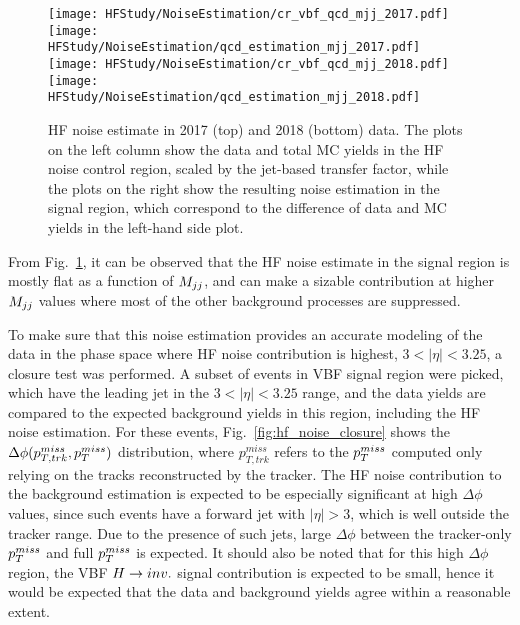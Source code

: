 \begin{figure}[h!]
    \centering
        \texttt{[image: HFStudy/NoiseEstimation/cr\_vbf\_qcd\_mjj\_2017.pdf]}
        \texttt{[image: HFStudy/NoiseEstimation/qcd\_estimation\_mjj\_2017.pdf]} \\ 
        \texttt{[image: HFStudy/NoiseEstimation/cr\_vbf\_qcd\_mjj\_2018.pdf]}
        \texttt{[image: HFStudy/NoiseEstimation/qcd\_estimation\_mjj\_2018.pdf]}
    \caption{HF noise estimate in 2017 (top) and 2018 (bottom) data. The plots on the left column show the data and total MC yields in the HF noise control region,
      scaled by the jet-based transfer factor, while the plots on the right show the resulting noise estimation in the signal region, which correspond to the difference of data and MC
      yields in the left-hand side plot.
    }
    \label{fig:hf_estimation_mtr}
\end{figure}

From Fig.~\ref{fig:hf_estimation_mtr}, it can be observed that the HF noise estimate in the signal region is mostly
flat as a function of $M_{jj}$, and can make a sizable contribution at higher $M_{jj}$ values where most of the other background
processes are suppressed.

To make sure that this noise estimation provides an accurate modeling of the data in the phase space where HF noise contribution is highest,
$3 < |\eta| < 3.25$, a closure test was performed. A subset of events in VBF signal region were picked, which have the leading jet in
the $3 < |\eta| < 3.25$ range, and the data yields are compared to the expected background yields in this region, including the HF noise estimation.
For these events, Fig.~\ref{fig:hf_noise_closure} shows the $\Delta\phi(p_{T,trk}^{miss}, p_T^{miss})$ distribution, where $p_{T,trk}^{miss}$ refers to the
$p_T^{miss}$ computed only relying on the tracks reconstructed by the tracker. The HF noise contribution to the background estimation is expected to be 
especially significant at high $\Delta\phi$ values,
since such events have a forward jet with $|\eta|>3$, which is well outside the tracker range. Due to the presence of such jets, 
large $\Delta\phi$ between the tracker-only $p_T^{miss}$
and full $p_T^{miss}$ is expected. It should also be noted that for this high $\Delta\phi$ region, the VBF $H \rightarrow inv.$ signal contribution is expected to be small,
hence it would be expected that the data and background yields agree within a reasonable extent.

